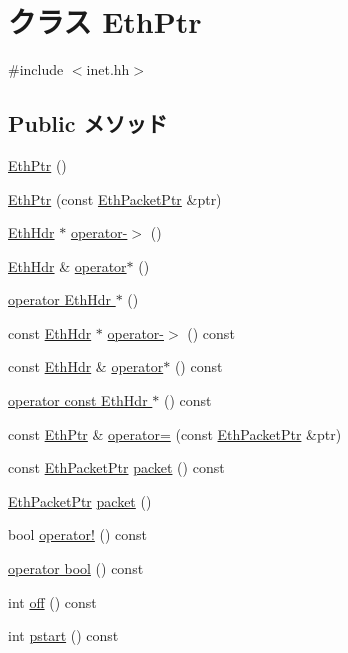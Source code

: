 \hypertarget{classNet_1_1EthPtr}{
\section{クラス EthPtr}
\label{classNet_1_1EthPtr}
}


{\ttfamily \#include $<$inet.hh$>$}\subsection*{Public メソッド}
\begin{DoxyCompactItemize}
\item 
\hyperlink{classNet_1_1EthPtr_adf874f340fa266b7e35f19f0b5ad5184}{EthPtr} ()
\item 
\hyperlink{classNet_1_1EthPtr_ae8d736d4c10ee329e7c9a6af3d9ef7e5}{EthPtr} (const \hyperlink{classRefCountingPtr}{EthPacketPtr} \&ptr)
\item 
\hyperlink{structNet_1_1EthHdr}{EthHdr} $\ast$ \hyperlink{classNet_1_1EthPtr_a2052a08e4c8b20c791ce160b46616234}{operator-\/$>$} ()
\item 
\hyperlink{structNet_1_1EthHdr}{EthHdr} \& \hyperlink{classNet_1_1EthPtr_ac8e3102ab3c8268a484913e355ff61c2}{operator$\ast$} ()
\item 
\hyperlink{classNet_1_1EthPtr_a9b3d3c77c792d971ebf5f4f2e07ff5e1}{operator EthHdr $\ast$} ()
\item 
const \hyperlink{structNet_1_1EthHdr}{EthHdr} $\ast$ \hyperlink{classNet_1_1EthPtr_a99f34a16b79c9394a9a8f011186a52ed}{operator-\/$>$} () const 
\item 
const \hyperlink{structNet_1_1EthHdr}{EthHdr} \& \hyperlink{classNet_1_1EthPtr_a9a3bab93af9c16eed0a09f218657b76a}{operator$\ast$} () const 
\item 
\hyperlink{classNet_1_1EthPtr_afad950f77e0684c02410878904f3c723}{operator const EthHdr $\ast$} () const 
\item 
const \hyperlink{classNet_1_1EthPtr}{EthPtr} \& \hyperlink{classNet_1_1EthPtr_a2dd4c8ad09a8ada02ddfd93b9d0ab4e4}{operator=} (const \hyperlink{classRefCountingPtr}{EthPacketPtr} \&ptr)
\item 
const \hyperlink{classRefCountingPtr}{EthPacketPtr} \hyperlink{classNet_1_1EthPtr_a13e32a6fa7b2f1b41d1d8dc32d8fda9e}{packet} () const 
\item 
\hyperlink{classRefCountingPtr}{EthPacketPtr} \hyperlink{classNet_1_1EthPtr_a549ac5c293e8047f1be38ca356e160da}{packet} ()
\item 
bool \hyperlink{classNet_1_1EthPtr_ac8b1d32dbd52d431450c70b151cfa205}{operator!} () const 
\item 
\hyperlink{classNet_1_1EthPtr_aa385aa18f5e42db5a415c25a90f4193d}{operator bool} () const 
\item 
int \hyperlink{classNet_1_1EthPtr_a81fa7ab0c6e92d4496ee915a8a3705f9}{off} () const 
\item 
int \hyperlink{classNet_1_1EthPtr_ae6fc8073bc02ff3fd03030e0936d56eb}{pstart} () const 
\end{DoxyCompactItemize}
